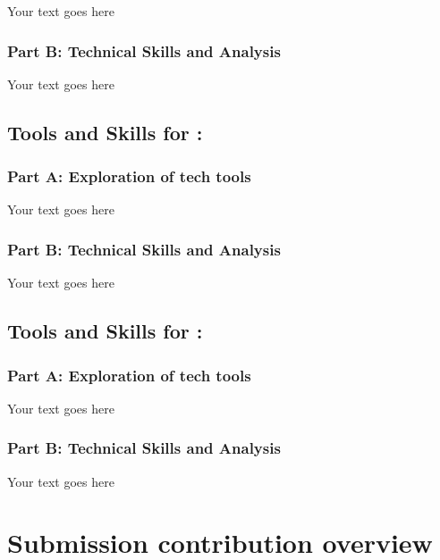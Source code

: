 \documentclass[a4paper, 11pt]{report}
\begin{document}
Your text goes here

\subsubsection{Part B: Technical Skills and Analysis}

Your text goes here




\subsection{Tools and Skills for \majC: \studC}

\subsubsection{Part A: Exploration of tech tools}

Your text goes here

\subsubsection{Part B: Technical Skills and Analysis}

Your text goes here




\subsection{Tools and Skills for \majD: \studD}

\subsubsection{Part A: Exploration of tech tools}

Your text goes here

\subsubsection{Part B: Technical Skills and Analysis}

Your text goes here


\newpage
\section{Submission contribution overview}
\end{document}
